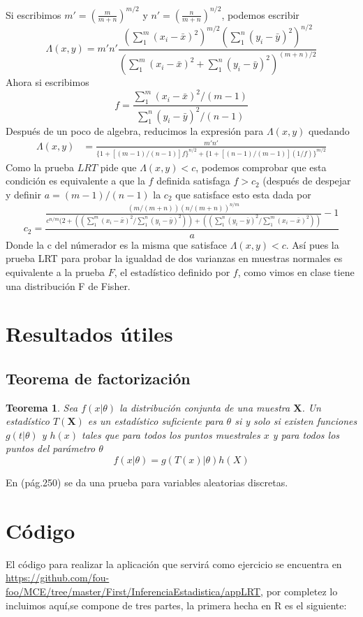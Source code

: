 \documentclass[peerreview]{IEEEtran}
\newtheorem{theorem}{Teorema}
\begin{document}
Si escribimos $m' = \left(\frac{m}{m+n} \right)^{m/2}$ y $n' = \left(\frac{n}{m+n} \right)^{n/2}$, podemos escribir 
\[ 
\Lambda(x,y) = m'n' \frac{\left( \sum_1^m(x_i -\bar{x})^2\right)^{ m/2} \left( \sum_1^n(y_i -\bar{y})^2\right)^{ n/2}}{\left( \sum_1^m(x_i -\bar{x})^2 + \sum_1^n(y_i -\bar{y})^2\right)^{ (m+n)/2}}
\]
Ahora si escribimos 
\[ f = \frac{\sum_1^m(x_i -\bar{x})^2/(m-1)}{\sum_1^n(y_i -\bar{y})^2/(n-1)}\]
Después de un poco de algebra, reducimos la expresión para $\Lambda(x,y)$ quedando 
\begin{equation*}
\begin{split}
\Lambda(x,y) & =  \frac{ m'n' }{\{1+ [(m-1)/(n-1) ]f \}^{n/2}+\{1+ [(n-1)/(m-1) ](1/f) \}^{m/2}}
\end{split}
\end{equation*}
Como la prueba $LRT$ pide que $\Lambda(x,y) <c$, podemos comprobar que esta condición es equivalente a que la $f$ definida satisfaga $f>c_2$ (después de despejar y definir $a=(m-1)/(n-1)$ la $c_2$ que satisface esto esta dada por 
\[
c_2 = \frac{\frac{(m/(m+n)) (n/(m+n))^{n/m} }{c^{n/m}(2+\left((\sum_1^m(x_i-\bar{x})^2/\sum_1^n(y_i-\bar{y})^2)\right) + \left((\sum_1^n(y_i-\bar{y})^2/\sum_1^m(x_i-\bar{x})^2)\right)}-1}{a}
\]
Donde la c del númerador es la misma que satisface $\Lambda(x,y) < c$. Así pues la prueba LRT para probar la igualdad de dos varianzas en muestras normales es equivalente a la prueba $F$, el estadístico definido por $f$, como vimos en clase tiene una distribución F de Fisher.

\section{Resultados útiles}
\subsection{Teorema de factorización}
\begin{theorem}
Sea $f(x|\theta)$ la distribución conjunta de una muestra $\mathbf{X}$. Un estadístico $T(\mathbf{X})$ es un estadístico suficiente para $\theta$ si y solo si existen funciones $g(t|\theta)$ y $h(x)$ tales que para todos los puntos muestrales $x$ y para todos los puntos del parámetro $\theta$ 
\[
f(x|\theta) = g(T(x)|\theta)h(X)
\]
\end{theorem}
En \cite{Casella} (pág.250) se da una prueba para variables aleatorias discretas.

\onecolumn
\section{Código}
El código para realizar la aplicación que servirá como ejercicio se encuentra en \url{https://github.com/fou-foo/MCE/tree/master/First/InferenciaEstadistica/appLRT}, por completez lo incluimos aquí,se compone de tres partes, la primera hecha en R es el siguiente:
\end{document}
